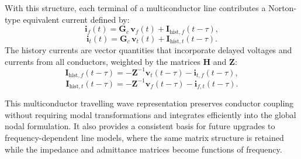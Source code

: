 With this structure, each terminal of a multiconductor line contributes a Norton-type equivalent current defined by:
\begin{equation}
    \bm{i}_f(t) = \bm{G}_c \, \bm{v}_f(t) + \bm{I}_{\mathrm{hist},f}(t-\tau),
\end{equation}
\begin{equation}
    \bm{i}_t(t) = \bm{G}_c \, \bm{v}_t(t) + \bm{I}_{\mathrm{hist},t}(t-\tau).
\end{equation}
The history currents are vector quantities that incorporate delayed voltages and currents from all conductors, weighted 
by the matrices $\bm{H}$ and $\bm{Z}$:
\begin{equation}
    \bm{I}_{\mathrm{hist},f}(t-\tau)
        = -\bm{Z}^{-1}\bm{v}_t(t-\tau)
          -\bm{i}_{t,f}(t-\tau),
\end{equation}
\begin{equation}
    \bm{I}_{\mathrm{hist},t}(t-\tau)
        = -\bm{Z}^{-1}\bm{v}_f(t-\tau)
          -\bm{i}_{f,t}(t-\tau).
\end{equation}

This multiconductor travelling wave representation preserves conductor coupling without requiring modal transformations 
and integrates efficiently into the global nodal formulation. It also provides a consistent basis for future upgrades to frequency-dependent 
line models, where the same matrix structure is retained while the impedance and admittance matrices become functions of frequency.

